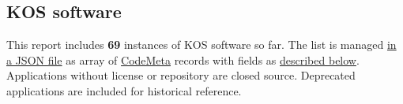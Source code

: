 \documentclass[
  DIV=10]{article}
\begin{document}
\subsection{KOS software}\label{kos-software}

This report includes \textbf{69} instances of KOS software so far. The
list is managed \href{kos-software.json}{in a JSON file} as array of
\href{https://codemeta.github.io/}{CodeMeta} records with fields as
\hyperref[metadata]{described below}. Applications without license or
repository are closed source. Deprecated applications are included for
historical reference.

\begin{longtable}[]{@{}lllllllll@{}}

\caption{\label{tbl-software}}

\tabularnewline


\end{longtable}
\end{document}
